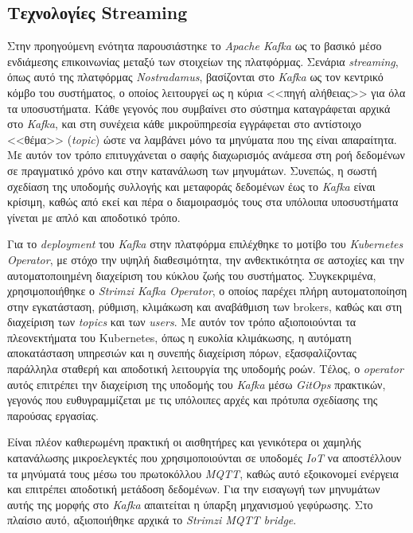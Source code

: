 \subsection{Τεχνολογίες Streaming}

Στην προηγούμενη ενότητα παρουσιάστηκε το \textit{Apache Kafka} ως το βασικό
μέσο ενδιάμεσης επικοινωνίας μεταξύ των στοιχείων της πλατφόρμας. Σενάρια
\textit{streaming}, όπως αυτό της πλατφόρμας \textit{Nostradamus}, βασίζονται
στο \textit{Kafka} ως τον κεντρικό κόμβο του συστήματος, ο οποίος λειτουργεί ως
η κύρια <<πηγή αλήθειας>> για όλα τα υποσυστήματα. Κάθε γεγονός που συμβαίνει
στο σύστημα καταγράφεται αρχικά στο \textit{Kafka}, και στη συνέχεια κάθε
μικροϋπηρεσία εγγράφεται στο αντίστοιχο <<θέμα>> (\textit{topic}) ώστε να
λαμβάνει μόνο τα μηνύματα που της είναι απαραίτητα. Με αυτόν τον τρόπο
επιτυγχάνεται ο σαφής διαχωρισμός ανάμεσα στη ροή δεδομένων σε πραγματικό χρόνο
και στην κατανάλωση των μηνυμάτων. Συνεπώς, η σωστή σχεδίαση της υποδομής
συλλογής και μεταφοράς δεδομένων έως το \textit{Kafka} είναι κρίσιμη, καθώς από
εκεί και πέρα ο διαμοιρασμός τους στα υπόλοιπα υποσυστήματα γίνεται με απλό και
αποδοτικό τρόπο.

Για το \textit{deployment} του \textit{Kafka} στην πλατφόρμα επιλέχθηκε το
μοτίβο του \textit{Kubernetes Operator}, με στόχο την υψηλή διαθεσιμότητα, την
ανθεκτικότητα σε αστοχίες και την αυτοματοποιημένη διαχείριση του κύκλου ζωής
του συστήματος. Συγκεκριμένα, χρησιμοποιήθηκε ο \textit{Strimzi Kafka
	Operator}, ο οποίος παρέχει πλήρη αυτοματοποίηση στην εγκατάσταση, ρύθμιση,
κλιμάκωση και αναβάθμιση των brokers, καθώς και στη διαχείριση των
\textit{topics} και των \textit{users}. Με αυτόν τον τρόπο αξιοποιούνται τα
πλεονεκτήματα του Kubernetes, όπως η ευκολία κλιμάκωσης, η αυτόματη
αποκατάσταση υπηρεσιών και η συνεπής διαχείριση πόρων, εξασφαλίζοντας παράλληλα
σταθερή και αποδοτική λειτουργία της υποδομής ροών. Τέλος, ο \textit{operator}
αυτός επιτρέπει την διαχείριση της υποδομής του \textit{Kafka} μέσω
\textit{GitOps} πρακτικών, γεγονός που ευθυγραμμίζεται με τις υπόλοιπες αρχές
και πρότυπα σχεδίασης της παρούσας εργασίας.

Είναι πλέον καθιερωμένη πρακτική οι αισθητήρες και γενικότερα οι χαμηλής
κατανάλωσης μικροελεγκτές που χρησιμοποιούνται σε υποδομές \textit{IoT} να
αποστέλλουν τα μηνύματά τους μέσω του πρωτοκόλλου \textit{MQTT}, καθώς αυτό
εξοικονομεί ενέργεια και επιτρέπει αποδοτική μετάδοση δεδομένων. Για την
εισαγωγή των μηνυμάτων αυτής της μορφής στο \textit{Kafka} απαιτείται η ύπαρξη
μηχανισμού γεφύρωσης. Στο πλαίσιο αυτό, αξιοποιήθηκε αρχικά το \textit{Strimzi
MQTT bridge}.


